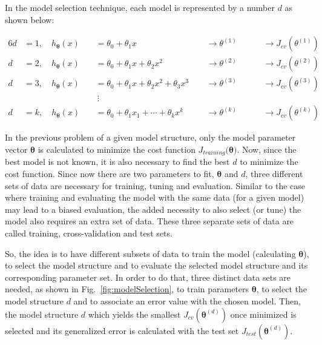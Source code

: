In the model selection technique, each model is represented by a number $d$ as shown below:

\begin{alignat*}{6}
\label{eqn:exampCostFunc}
d &= 1, \quad h_{{\bm{\theta}}}(x) \ && = \theta_0 + \theta_1 x\ \ && \longrightarrow \theta^{(1)}\ \ && \quad \longrightarrow J_{cv}(\theta^{(1)})\
\\
d &= 2, \quad h_{{\bm{\theta}}}(x) \ && = \theta_0 + \theta_1 x + \theta_2 x^2 \ \ && \longrightarrow \theta^{(2)}\ \ && \quad \longrightarrow J_{cv}(\theta^{(2)})\
\\
d &= 3, \quad h_{{\bm{\theta}}}(x) \ && = \theta_0 + \theta_1 x + \theta_2 x^2 + \theta_3 x^3\ \ && \longrightarrow \theta^{(3)}\ \ && \quad \longrightarrow J_{cv}(\theta^{(3)})\
\\
& \ &&\ \vdots \ &&\ \ &&\ 
\\
d &= k, \quad h_{{\bm{\theta}}}(x) \ && = \theta_0 + \theta_1 x_1 + \cdots+ \theta_k x^k\ \ && \longrightarrow \theta^{(k)}\ \ && \quad \longrightarrow J_{cv}(\theta^{(k)})\
\end{alignat*}

In the previous problem of a given model structure, only the model parameter vector $\bm{\theta}$ is calculated to minimize the cost function $J_{training}(\bm{\theta)}$.
Now, since the best model is not known, it is also necessary to find the best $d$ to minimize the cost function. 
Since now there are two parameters to fit, $\bm{\theta}$ and $d$, three different sets of data are necessary for training, tuning and evaluation.
Similar to the case where training and evaluating the model with the same data (for a given model) may lead to a biased evaluation, the added necessity to also select (or tune) the model also requires an extra set of data. These three separate sets of data are called training, cross-validation and test sets.

So, the idea is to have different subsets of data to train the model (calculating ${\bm{\theta}}$), to select the model structure and to evaluate the selected model structure and its corresponding parameter set. 
In order to do that, three distinct data sets are needed, as shown in Fig.~\ref{fig:modelSelection}, to train parameters ${\bm{\theta}}$, to select the model structure $d$ and to associate an error value with the chosen model. 
Then, the model structure $d$ which yields the smallest $J_{cv}({\bm{\theta}}^{(d)})$ once minimized is selected and its generalized error is calculated with the test set $J_{test}({\bm{\theta}}^{(d)})$.

